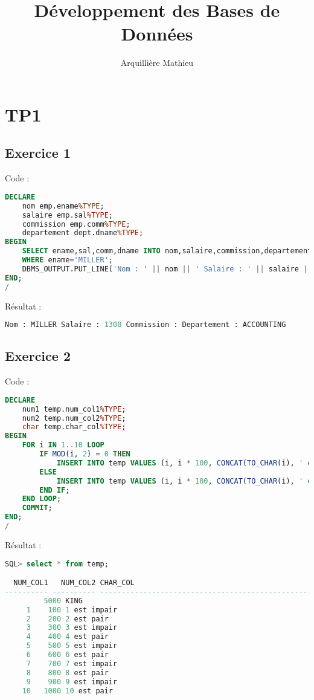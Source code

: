 \documentclass{article}
\title{Développement des Bases de Données}
\author{Arquillière Mathieu}
\begin{document}
\begin{titlepage}
  \maketitle
\end{titlepage}

\newpage

\section{TP1}

\subsection{Exercice 1}
Code :
\begin{lstlisting}[language=SQL,
    morekeywords={DECLARE, LOOP, TYPE, FOR, IF, IS, OPEN, FETCH, DBMS_OUTPUT, PUT_LINE}]
DECLARE
    nom emp.ename%TYPE;
    salaire emp.sal%TYPE;
    commission emp.comm%TYPE;
    departement dept.dname%TYPE;
BEGIN 
    SELECT ename,sal,comm,dname INTO nom,salaire,commission,departement FROM Emp NATURAL JOIN Dept
    WHERE ename='MILLER';
    DBMS_OUTPUT.PUT_LINE('Nom : ' || nom || ' Salaire : ' || salaire || ' Commission : ' || commission || 'Departement : ' || departement);
END;
/
\end{lstlisting}

Résultat :
\begin{lstlisting}[language=SQL,
    morekeywords={DECLARE, LOOP, TYPE, FOR, IF, IS, OPEN, FETCH, DBMS_OUTPUT, PUT_LINE}]
Nom : MILLER Salaire : 1300 Commission : Departement : ACCOUNTING
\end{lstlisting}

\subsection{Exercice 2}
Code :
\begin{lstlisting}[language=SQL,
    deletekeywords={char},
    morekeywords={DECLARE, LOOP, TYPE, FOR, IF, IS, OPEN, FETCH, DBMS_OUTPUT, PUT_LINE}]
DECLARE
    num1 temp.num_col1%TYPE;
    num2 temp.num_col2%TYPE;
    char temp.char_col%TYPE;
BEGIN
	FOR i IN 1..10 LOOP
		IF MOD(i, 2) = 0 THEN
			INSERT INTO temp VALUES (i, i * 100, CONCAT(TO_CHAR(i), ' est pair'));
		ELSE
			INSERT INTO temp VALUES (i, i * 100, CONCAT(TO_CHAR(i), ' est impair'));
		END IF;
	END LOOP;
	COMMIT;
END;
/
\end{lstlisting}

Résultat :
\begin{lstlisting}[language=SQL,
    morekeywords={DECLARE, LOOP, TYPE, FOR, IF, IS, OPEN, FETCH, DBMS_OUTPUT, PUT_LINE}]
SQL> select * from temp;

  NUM_COL1   NUM_COL2 CHAR_COL
---------- ---------- -------------------------------------------------------
		 5000 KING
	 1	  100 1 est impair
	 2	  200 2 est pair
	 3	  300 3 est impair
	 4	  400 4 est pair
	 5	  500 5 est impair
	 6	  600 6 est pair
	 7	  700 7 est impair
	 8	  800 8 est pair
	 9	  900 9 est impair
	10	 1000 10 est pair
\end{lstlisting}
\end{document}
